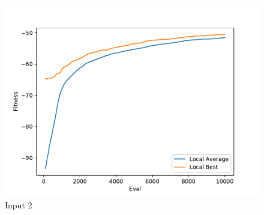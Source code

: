 \documentclass{standalone}
\begin{document}
\begin{figure}[!htb]
	\caption{Input 2}
	\label{fig:graph_2026}
	\includegraphics[width=\textwidth]{../graphs/graphs/2026.pdf}
\end{figure}
\end{document}

